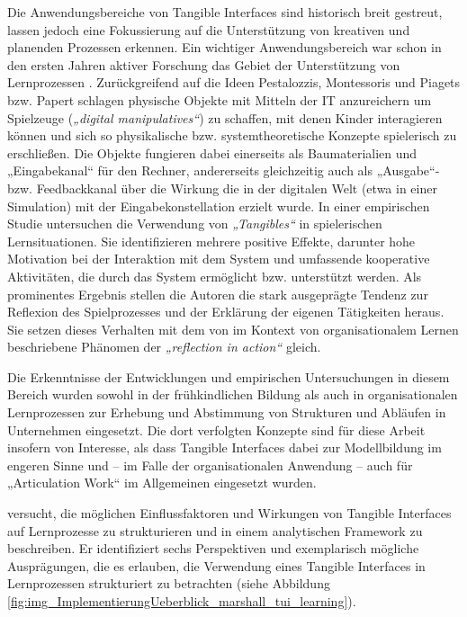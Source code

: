 Die Anwendungsbereiche von Tangible Interfaces sind historisch breit gestreut, lassen jedoch eine Fokussierung auf die Unterstützung von kreativen und planenden Prozessen erkennen. Ein wichtiger Anwendungsbereich war schon in den ersten Jahren aktiver Forschung das Gebiet der Unterstützung von Lernprozessen \citep{Resnick98}. Zurückgreifend auf die Ideen Pestalozzis, Montessoris \citep{Montessori05} und Piagets \citep{Piaget76} bzw. Papert \citep{Papert00} schlagen \citet{Resnick98} physische Objekte mit Mitteln der IT anzureichern um Spielzeuge (\emph{„digital manipulatives“}) zu schaffen, mit denen Kinder interagieren können und sich so physikalische bzw. systemtheoretische Konzepte spielerisch zu erschließen. Die Objekte fungieren dabei einerseits als Baumaterialien und „Eingabekanal“ für den Rechner, andererseits gleichzeitig auch als „Ausgabe“- bzw. Feedbackkanal über die Wirkung die in der digitalen Welt (etwa in einer Simulation) mit der Eingabekonstellation erzielt wurde. In einer empirischen Studie untersuchen \citet{Price03} die Verwendung von \emph{„Tangibles“} in spielerischen Lernsituationen. Sie identifizieren mehrere positive Effekte, darunter hohe Motivation bei der Interaktion mit dem System und umfassende kooperative Aktivitäten, die durch das System ermöglicht bzw. unterstützt werden. Als prominentes Ergebnis stellen die Autoren die stark ausgeprägte Tendenz zur Reflexion des Spielprozesses und der Erklärung der eigenen Tätigkeiten heraus. Sie setzen dieses Verhalten mit dem von \citet{Schon84} im Kontext von organisationalem Lernen beschriebene Phänomen der \emph{„reflection in action“} gleich. 

Die Erkenntnisse der Entwicklungen und empirischen Untersuchungen in diesem Bereich wurden sowohl in der frühkindlichen Bildung \citep{Zuckerman05} als auch in organisationalen Lernprozessen zur Erhebung und Abstimmung von Strukturen und Abläufen in Unternehmen \citep{Lego02} eingesetzt. Die dort verfolgten Konzepte sind für diese Arbeit insofern von Interesse, als dass Tangible Interfaces dabei zur Modellbildung im engeren Sinne und -- im Falle der organisationalen Anwendung -- auch für „Articulation Work“ im Allgemeinen eingesetzt wurden.

\citet{Marshall07} versucht, die möglichen Einflussfaktoren und Wirkungen von Tangible Interfaces auf Lernprozesse zu strukturieren und in einem analytischen Framework zu beschreiben. Er identifiziert sechs Perspektiven und exemplarisch mögliche Ausprägungen, die es erlauben, die Verwendung eines Tangible Interfaces in Lernprozessen strukturiert zu betrachten (siehe Abbildung \ref{fig:img_ImplementierungUeberblick_marshall_tui_learning}). 

